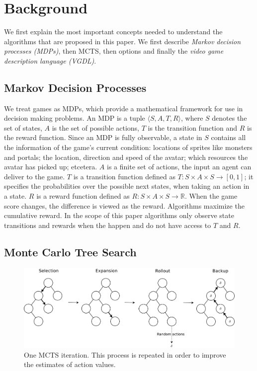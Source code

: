 \section{Background}
\label{sec:background}

We first explain the most important concepts needed to understand the
algorithms that are proposed in this paper. We first describe \emph{Markov
decision processes (MDPs)}, then  MCTS, then options and finally the \emph{video
game description language (VGDL)}.

\subsection{Markov Decision Processes}
\label{subsec:mdps}
We treat games as MDPs, which provide a mathematical framework for use in
decision making problems. An MDP is a tuple $\langle S, A, T, R \rangle$, where
$S$ denotes the set of states, $A$ is the set of possible actions, $T$ is the
transition function and $R$ is the reward function. Since an MDP is fully
observable, a state in $S$ contains all the information of the game's current
condition: locations of sprites like monsters and portals; the location,
direction and speed of the avatar; which resources the avatar has picked up;
etcetera. $A$ is a finite set of actions, the input an agent can deliver to the
game. $T$ is a transition function defined as $T : S \times A \times S
\rightarrow \left[0,1\right]$; it specifies the probabilities over the possible
next states, when taking an action in a state.  $R$ is a reward function defined
as $R: S \times A \times S \rightarrow \mathbb{R}$. When the game score changes,
the difference is viewed as the reward.  Algorithms maximize the cumulative
reward. In the scope of this paper algorithms only observe state transitions
and rewards when the happen and do not have access to $T$ and $R$.

\subsection{Monte Carlo Tree Search}
\begin{figure}
	\centering
	\includegraphics[width=\columnwidth]{includes/mcts-wide-eps-converted-to}
	\caption{One MCTS iteration. This process is repeated in order to improve
	the estimates of action values.}
\label{fig:mcts}
\end{figure}

